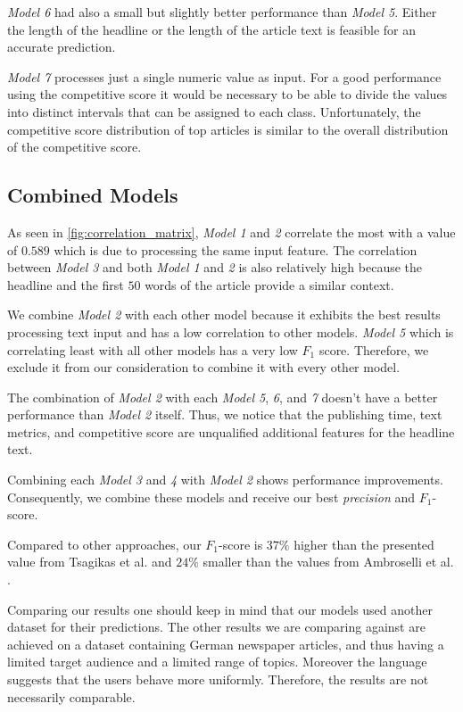 \textit{Model 6} had also a small but slightly better performance than \textit{Model 5}. 
Either the length of the headline or the length of the article text is feasible for an accurate prediction.

\textit{Model 7} processes just a single numeric value as input. For a good performance using the competitive score it would be necessary to be able to divide the values into distinct intervals that can be assigned to each class.
Unfortunately, the competitive score distribution of top articles is similar to the overall distribution of the competitive score.



\subsection{Combined Models}
As seen in \autoref{fig:correlation_matrix}, \textit{Model 1} and \textit{2} correlate the most with a value of $0.589$ which is due to processing the same input feature.
The correlation between \textit{Model 3} and both \textit{Model 1} and \textit{2} is also relatively high because the headline and the first $50$ words of the article provide a similar context.

We combine \textit{Model 2} with each other model because it exhibits the best results processing text input and has a low correlation to other models.
\textit{Model 5} which is correlating least with all other models has a very low $F_1$ score. Therefore, we exclude it from our consideration to combine it with every other model.

The combination of \textit{Model 2} with each \textit{Model 5}, \textit{6}, and \textit{7} doesn't have a better performance than \textit{Model 2} itself. 
Thus, we notice that the publishing time, text metrics, and competitive score are unqualified additional features for the headline text.

Combining each \textit{Model 3} and \textit{4} with \textit{Model 2} shows performance improvements. Consequently, we combine these models and receive our best \textit{precision} and $F_1$-score.

Compared to other approaches, our $F_1$-score is $37\%$ higher than the presented value from Tsagikas et al. \cite{tsagkias2009predicting} and $24\%$ smaller than the values from Ambroselli et al. \cite{ambroselli2018prediction}. 

Comparing our results one should keep in mind that our models used another dataset for their predictions.
The other results we are comparing against are achieved on a dataset containing German newspaper articles, and thus having a limited target audience and a limited range of topics.
Moreover the language suggests that the users behave more uniformly.
Therefore, the results are not necessarily comparable.

